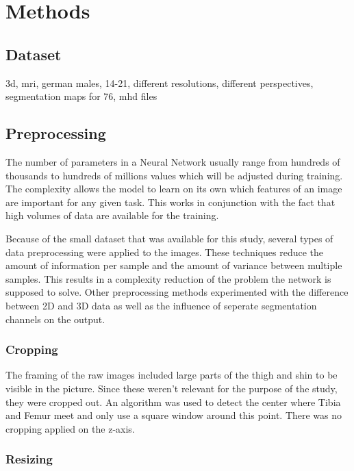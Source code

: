 \section{Methods}

\subsection{Dataset}

3d, mri, german males, 14-21, different resolutions, different perspectives, segmentation maps for 76, mhd files



\subsection{Preprocessing}

The number of parameters in a Neural Network usually range from hundreds of thousands to hundreds of millions values which will be adjusted during training. The complexity allows the model to learn on its own which features of an image are important for any given task. This works in conjunction with the fact that high volumes of data are available for the training.

Because of the small dataset that was available for this study, several types of data preprocessing were applied to the images. These techniques reduce the amount of information per sample and the amount of variance between multiple samples. This results in a complexity reduction of the problem the network is supposed to solve. Other preprocessing methods experimented with the difference between 2D and 3D data as well as the influence of seperate segmentation channels on the output.

\subsubsection{Cropping}

The framing of the raw images included large parts of the thigh and shin to be visible in the picture. Since these weren't relevant for the purpose of the study, they were cropped out. An algorithm was used to detect the center where Tibia and Femur meet and only use a square window around this point. There was no cropping applied on the z-axis.

\subsubsection{Resizing}


